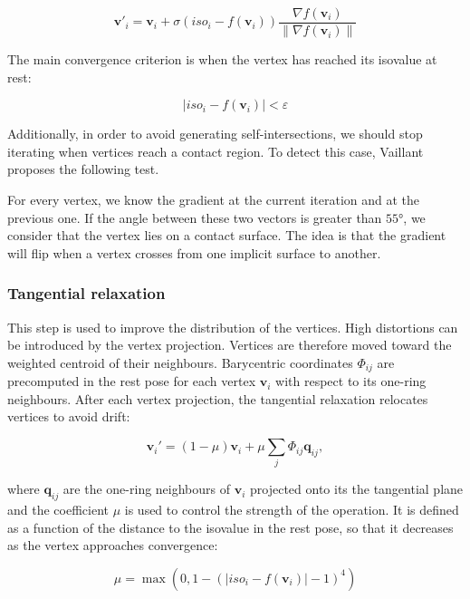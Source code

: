 \documentclass[a4paper,10pt]{article}
\begin{document}
\begin{multicols}{2}
\begin{equation*}
\mathbf{v'}_i = \mathbf{v}_i + \sigma (iso_i - f(\mathbf{v}_i)) \frac{\nabla f(\mathbf{v}_i)}{\left\| \nabla f(\mathbf{v}_i) \right\| }
\end{equation*}

The main convergence criterion is when the vertex has reached its isovalue at rest:

\begin{equation*}
|iso_i - f(\mathbf{v}_i)| < \varepsilon
\end{equation*}

Additionally, in order to avoid generating self-intersections, we should stop iterating when vertices reach a contact region.
To detect this case, Vaillant proposes the following test.

For every vertex, we know the gradient at the current iteration and at the previous one.
If the angle between these two vectors is greater than $55°$, we consider that the vertex lies on a contact surface.
The idea is that the gradient will flip when a vertex crosses from one implicit surface to another.


\subsubsection{Tangential relaxation}

This step is used to improve the distribution of the vertices.
High distortions can be introduced by the vertex projection.
Vertices are therefore moved toward the weighted centroid of their neighbours.
Barycentric coordinates $\Phi_{ij}$ are precomputed in the rest pose for each vertex $\mathbf{v}_i$ with respect to its one-ring neighbours.
After each vertex projection, the tangential relaxation relocates vertices to avoid drift:

\begin{equation*}
\mathbf{v}_i' = (1 - \mu) \mathbf{v}_i + \mu \sum_j \Phi_{ij} \mathbf{q}_{ij},
\end{equation*}

where $\mathbf{q}_{ij}$ are the one-ring neighbours of $\mathbf{v}_i$ projected onto its the tangential plane and the coefficient $\mu$ is used to control the strength of the operation.
It is defined as a function of the distance to the isovalue in the rest pose, so that it decreases as the vertex approaches convergence:

\begin{equation*}
\mu = \max\left(0, 1 - \left(|iso_i - f(\mathbf{v}_i)| - 1\right)^4\right)
\end{equation*}


\end{multicols}
\end{document}
